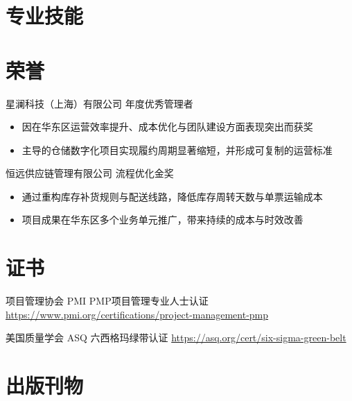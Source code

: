 \documentclass[a4paper, serif, 10pt]{moderncv}
\begin{document}
\section{专业技能}

\section{荣誉}

        {星澜科技（上海）有限公司}
        {年度优秀管理者}
        {}
        {}
        {\begin{itemize}
\item 因在华东区运营效率提升、成本优化与团队建设方面表现突出而获奖
\item 主导的仓储数字化项目实现履约周期显著缩短，并形成可复制的运营标准
\end{itemize}}

        {恒远供应链管理有限公司}
        {流程优化金奖}
        {}
        {}
        {\begin{itemize}
\item 通过重构库存补货规则与配送线路，降低库存周转天数与单票运输成本
\item 项目成果在华东区多个业务单元推广，带来持续的成本与时效改善
\end{itemize}}
\section{证书}

        {项目管理协会 PMI}
        {PMP项目管理专业人士认证}
        {\url{https://www.pmi.org/certifications/project-management-pmp}}
        {}
        {}

        {美国质量学会 ASQ}
        {六西格玛绿带认证}
        {\url{https://asq.org/cert/six-sigma-green-belt}}
        {}
        {}
\section{出版刊物}
\end{document}

